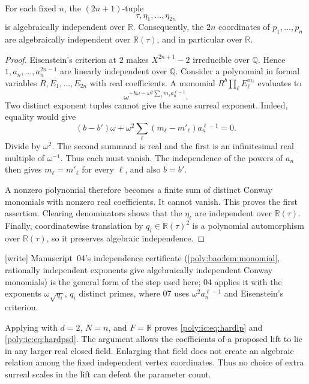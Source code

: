 \documentclass[11pt,a4paper]{article}
\numberwithin{equation}{section}
\theoremstyle{plain}
\newcommand{\wtag}{\textup{[write]}}%
\newcommand{\R}{\mathbb R}
\newcommand{\Q}{\mathbb Q}
\begin{document}
\begin{lemma}\label{poly:ic:lem:independence}
For each fixed $n$, the $(2n+1)$-tuple
\[
 \tau,\eta_1,\ldots,\eta_{2n}
\]
is algebraically independent over $\R$. Consequently, the $2n$ coordinates
of $p_1,\ldots,p_n$ are algebraically independent over $\R(\tau)$, and
in particular over $\R$.
\end{lemma}
\begin{proof}
Eisenstein's criterion at $2$ makes $X^{2n+1}-2$ irreducible over $\Q$.
Hence $1,a_n,\ldots,a_n^{2n-1}$ are linearly independent over $\Q$.
Consider a polynomial in formal variables $R,E_1,\ldots,E_{2n}$ with
real coefficients. A monomial
$R^b\prod_\ell E_\ell^{m_\ell}$ evaluates to
\[
 \omega^{-b\omega-\omega^2\sum_\ell m_\ell a_n^{\ell-1}}.
\]
Two distinct exponent tuples cannot give the same surreal exponent.
Indeed, equality would give
\[
 (b-b')\omega+
 \omega^2\sum_\ell(m_\ell-m'_\ell)a_n^{\ell-1}=0.
\]
Divide by $\omega^2$. The second summand is real and the first is an
infinitesimal real multiple of $\omega^{-1}$. Thus each must vanish.
The independence of the powers of $a_n$ then gives $m_\ell=m'_\ell$
for every $\ell$, and also $b=b'$.

A nonzero polynomial therefore becomes a finite sum of distinct Conway
monomials with nonzero real coefficients. It cannot vanish. This proves
the first assertion. Clearing denominators shows that the $\eta_\ell$
are independent over $\R(\tau)$. Finally, coordinatewise translation by
$q_i\in\R(\tau)^2$ is a polynomial automorphism over $\R(\tau)$, so
it preserves algebraic independence.
\end{proof}

\wtag{} Manuscript~04's independence certificate (\cref{poly:bao:lem:monomial},
rationally independent exponents give algebraically independent Conway
monomials) is the general form of the step used here; 04 applies it with
the exponents $\omega\sqrt{q_i}$, $q_i$ distinct primes, where 07 uses
$\omega^2a_n^{\ell-1}$ and Eisenstein's criterion.

Applying  with $d=2$, $N=n$, and
$F=\R$ proves \eqref{poly:ic:eq:hardlp} and \eqref{poly:ic:eq:hardpsd}. The argument
allows the coefficients of a proposed lift to lie in any larger real
closed field. Enlarging that field does not create an algebraic relation
among the fixed independent vertex coordinates. Thus no choice of extra
surreal scales in the lift can defeat the parameter count.
\end{document}
